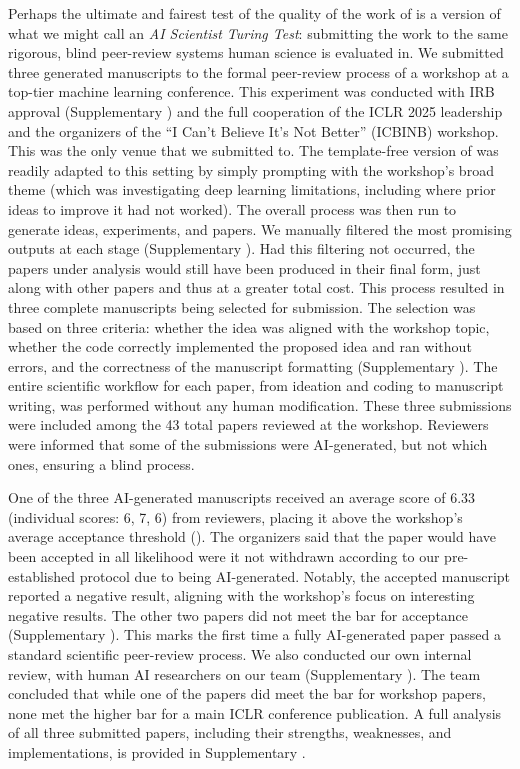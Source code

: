 Perhaps the ultimate and fairest test of the quality of the work of \ouralgo is a version of what we might call an \emph{AI Scientist Turing Test}: submitting the work to the same rigorous, blind peer-review systems human science is evaluated in.
We submitted three generated manuscripts to the formal peer-review process of a workshop at a top-tier machine learning conference.
This experiment was conducted with IRB approval (Supplementary ) and the full cooperation of the ICLR 2025 leadership and the organizers of the ``I Can't Believe It's Not Better'' (ICBINB) workshop.
This was the only venue that we submitted to.
The template-free version of \ouralgo was readily adapted to this setting by simply prompting with the workshop's broad theme (which was investigating deep learning limitations, including where prior ideas to improve it had not worked).
The overall process was then run to generate ideas, experiments, and papers. We manually filtered the most promising outputs at each stage (Supplementary ). Had this filtering not occurred, the papers under analysis would still have been produced in their final form, just along with other papers and thus at a greater total cost.
This process resulted in three complete manuscripts being selected for submission.
The selection was based on three criteria: whether the idea was aligned with the workshop topic, whether the code correctly implemented the proposed idea and ran without errors, and the correctness of the manuscript formatting (Supplementary ).
The entire scientific workflow for each paper, from ideation and coding to manuscript writing, was performed without any human modification.
These three submissions were included among the 43 total papers reviewed at the workshop.
Reviewers were informed that some of the submissions were AI-generated, but not which ones, ensuring a blind process.

One of the three AI-generated manuscripts received an average score of 6.33 (individual scores: 6, 7, 6) from reviewers, placing it above the workshop's average acceptance threshold ().
The organizers said that the paper would have been accepted in all likelihood were it not withdrawn according to our pre-established protocol due to being AI-generated.
Notably, the accepted manuscript reported a negative result, aligning with the workshop's focus on interesting negative results.
The other two papers did not meet the bar for acceptance (Supplementary ).
This marks the first time a fully AI-generated paper passed a standard scientific peer-review process.
We also conducted our own internal review, with human AI researchers on our team (Supplementary ).
The team concluded that while one of the papers did meet the bar for workshop papers, none met the higher bar for a main ICLR conference publication.
A full analysis of all three submitted papers, including their strengths, weaknesses, and implementations, is provided in Supplementary .

